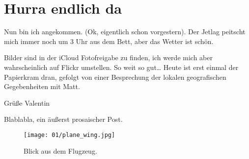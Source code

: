 \chapter{Hurra endlich da}

Nun bin ich angekommen. (Ok, eigentlich schon vorgestern). Der Jetlag
peitscht mich immer noch um 3 Uhr aus dem Bett, aber das Wetter ist
schön.

Bilder sind in der iCloud Fotofreigabe zu finden, ich werde mich aber
wahrscheinlich auf Flickr umstellen. So weit so gut\ldots{} Heute ist
erst einmal der Papierkram dran, gefolgt von einer Besprechung der
lokalen geografischen Gegebenheiten mit Matt.

Grüße Valentin

Blablabla, ein äußerst prosaischer Post.

\begin{figure}[p]
  \centering
  \texttt{[image: 01/plane\_wing.jpg]}
  \caption*{Blick aus dem Flugzeug.}
\end{figure}
